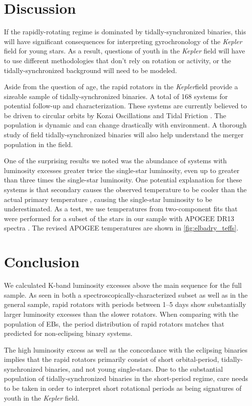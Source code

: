 \documentclass[manuscript]{aastex6}
\newcommand{\Kepler}{\mbox{\textit{Kepler}}}
\newcommand{\gvs}{\authorcomment1}
\begin{document}
\section{Discussion}
\label{sec:discussion}

If the rapidly-rotating regime is dominated by tidally-synchronized binaries,
this will have significant consequences for interpreting gyrochronology of the
\Kepler{} field for young stars. As a result, questions of youth in the
\Kepler{} field will have to use different methodologies that don't rely on
rotation or activity, or the tidally-synchronized background will need to be
modeled. 

Aside from the question of age, the rapid rotators in the \Kepler field provide
a sizeable sample of tidally-synchronized binaries. A total of 168 systems for
potential follow-up and characterization. These systems are currently believed
to be driven to circular orbits by Kozai Oscillations and Tidal Friction
\citep{Fabricky12}. The population is dynamic and can change drastically with
environment. A thorough study of field tidally-synchronized binaries will also
help understand the merger population in the field.

One of the surprising results we noted was the abundance of systems with
luminosity excesses greater twice the single-star luminosity, even up to
greater than three times the single-star luminosity. One potential
explanation for these systems is that secondary causes the observed temperature
to be cooler than the actual primary temperature \citep{ElBadry17}, causing the single-star
luminosity to be underestimated. As a test, we use temperatures from
two-component fits that were performed for a subset of the stars in our sample
with APOGEE DR13 spectra \citep{ElBadry18}. The revised APOGEE temperatures are
shown in \cref{fig:elbadry_teffs}. \gvs{Continue this analysis.}

\section{Conclusion}
\label{sec:conclusions}

We calculated K-band luminosity excesses above the main sequence for the full
\citet{McQuillan14} sample. As seen in both a spectroscopically-characterized
subset as well as in the general sample, rapid rotators with periods between
1--5 days show substantially larger luminosity excesses than the slower
rotators. When comparing with the population of EBs, the period distribution of
rapid rotators matches that predicted for non-eclipsing binary systems.

The high luminosity excess as well as the concordance with the eclipsing
binaries implies that the rapid rotators primarily consist of short
orbital-period, tidally-synchronized binaries, and not young
single-stars. Due to the substantial population of tidally-synchronized
binaries in the short-period regime, care needs to be taken in order to
interpret short rotational periods as being signatures of youth in the
\Kepler{} field.



\end{document}
